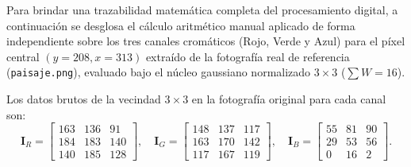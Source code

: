 \documentclass[11pt]{article}
\begin{document}
Para brindar una trazabilidad matemática completa del procesamiento digital, a continuación se desglosa el cálculo aritmético manual aplicado de forma independiente sobre los tres canales cromáticos (Rojo, Verde y Azul) para el píxel central $(y=208, x=313)$ extraído de la fotografía real de referencia (\texttt{paisaje.png}), evaluado bajo el núcleo gaussiano normalizado $3\times3$ ($\sum W = 16$).

Los datos brutos de la vecindad $3\times3$ en la fotografía original para cada canal son:
\begin{equation}
\mathbf{I}_R = \begin{bmatrix} 163 & 136 & 91 \\ 184 & 183 & 140 \\ 140 & 185 & 128 \end{bmatrix}, \quad
\mathbf{I}_G = \begin{bmatrix} 148 & 137 & 117 \\ 163 & 170 & 142 \\ 117 & 167 & 119 \end{bmatrix}, \quad
\mathbf{I}_B = \begin{bmatrix} 55 & 81 & 90 \\ 29 & 53 & 56 \\ 0 & 16 & 2 \end{bmatrix}.
\end{equation}
\end{document}
